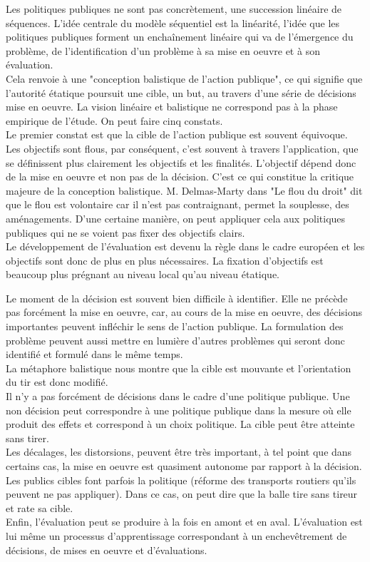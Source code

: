 \documentclass[10pt, a4paper, openany]{book}
\begin{document}
Les politiques publiques ne sont pas concrètement, une succession linéaire de séquences. L'idée centrale du modèle séquentiel est la linéarité, l'idée que les politiques publiques forment un enchaînement linéaire qui va de l'émergence du problème, de l'identification d'un problème à sa mise en oeuvre et à son évaluation. \\
Cela renvoie à une "conception balistique de l'action publique", ce qui signifie que l'autorité étatique poursuit une cible, un but, au travers d'une série de décisions mise en oeuvre. La vision linéaire et balistique ne correspond pas à la phase empirique de l'étude. On peut faire cinq constats. \\
Le premier constat est que la cible de l'action publique est souvent équivoque. Les objectifs sont flous, par conséquent, c'est souvent à travers l'application, que se définissent plus clairement les objectifs et les finalités. L'objectif dépend donc de la mise en oeuvre et non pas de la décision. C'est ce qui constitue la critique majeure de la conception balistique. M. Delmas-Marty dans "Le flou du droit" dit que le flou est volontaire car il n'est pas contraignant, permet la souplesse, des aménagements. D'une certaine manière, on peut appliquer cela aux politiques publiques qui ne se voient pas fixer des objectifs clairs. \\
Le développement de l'évaluation est devenu la règle dans le cadre européen et les objectifs sont donc de plus en plus nécessaires. La fixation d'objectifs est beaucoup plus prégnant au niveau local qu'au niveau étatique. 


Le moment de la décision est souvent bien difficile à identifier. Elle ne précède pas forcément la mise en oeuvre, car, au cours de la mise en oeuvre, des décisions importantes peuvent infléchir le sens de l'action publique. La formulation des problème peuvent aussi mettre en lumière d'autres problèmes qui seront donc identifié et formulé dans le même temps. \\
La métaphore balistique nous montre que la cible est mouvante et l'orientation du tir est donc modifié. \\
Il n'y a pas forcément de décisions dans le cadre d'une politique publique. Une non décision peut correspondre à une politique publique dans la mesure où elle produit des effets et correspond à un choix politique. La cible peut être atteinte sans tirer. \\
Les décalages, les distorsions, peuvent être très important, à tel point que dans certains cas, la mise en oeuvre est quasiment autonome par rapport à la décision. Les publics cibles font parfois la politique (réforme des transports routiers qu'ils peuvent ne pas appliquer). Dans ce cas, on peut dire que la balle tire sans tireur et rate sa cible. \\
Enfin, l'évaluation peut se produire à la fois en amont et en aval. L'évaluation est lui même un processus d'apprentissage correspondant à un enchevêtrement de décisions, de mises en oeuvre et d'évaluations.
\end{document}
